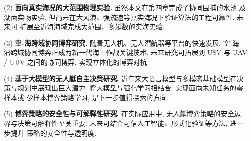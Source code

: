 (2) \textbf{面向真实海况的大范围物理实验.} 虽然本文在第四章完成了协同围捕的水池
及湖面实物实验, 但尚未在大风浪、强流速等真实海况下验证算法的工程可靠性. 未来可
扩展至近海海域完成大范围、多艇数的实海实验.

(3) \textbf{空-海跨域协同博弈研究.} 随着无人机、无人潜航器等平台的快速发展, 空-海-
潜跨域协同博弈正成为新一代海上作战关键技术. 未来研究可拓展到 USV 与 UAV / UUV
之间的协同博弈, 实现立体化的博弈对抗.

(4) \textbf{基于大模型的无人艇自主决策研究.} 近年来大语言模型与多模态基础模型在决
策与规划中展现出巨大潜力. 将大模型与强化学习相结合, 实现面向未知任务的零样本或
少样本博弈策略学习, 是下一步值得探索的方向.

(5) \textbf{博弈策略的安全性与可解释性研究.} 在实际应用中, 无人艇博弈策略的安全边
界与决策可解释性至关重要. 未来可结合可信人工智能、形式化验证等方法, 进一步提升
策略的安全性与透明度.

